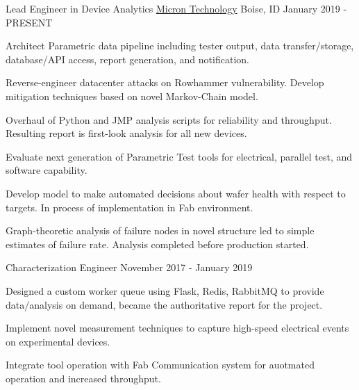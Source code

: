 

\begin{cventries}

  \cventry
    {Lead Engineer in Device Analytics} %
    {\href{https://www.micron.com}{Micron Technology}} %
    {Boise, ID} %
    {January 2019 - PRESENT} %
    {
      \begin{cvitems} %
        \item {Architect Parametric data pipeline including tester output, data transfer/storage, database/API access, report generation, and notification.}
        \item {Reverse-engineer datacenter attacks on Rowhammer vulnerability. Develop mitigation techniques based on novel Markov-Chain model.}
        \item {Overhaul of Python and JMP analysis scripts for reliability and throughput. Resulting report is first-look analysis for all new devices.}
        \item {Evaluate next generation of Parametric Test tools for electrical, parallel test, and software capability.}
        \item {Develop model to make automated decisions about wafer health with respect to targets. In process of implementation in Fab environment.}
        \item {Graph-theoretic analysis of failure nodes in novel structure led to simple estimates of failure rate. Analysis completed before production started.}
      \end{cvitems}
    }

  \cventry
    {Characterization Engineer} %
    {} %
    {} %
    {November 2017 - January 2019} %
    {
      \begin{cvitems} %
        \item {Designed a custom worker queue using Flask, Redis, RabbitMQ to provide data/analysis on demand, became the authoritative report for the project.}
        \item {Implement novel measurement techniques to capture high-speed electrical events on experimental devices.}
        \item {Integrate tool operation with Fab Communication system for auotmated operation and increased throughput.}
      \end{cvitems}
    }


\end{cventries}
